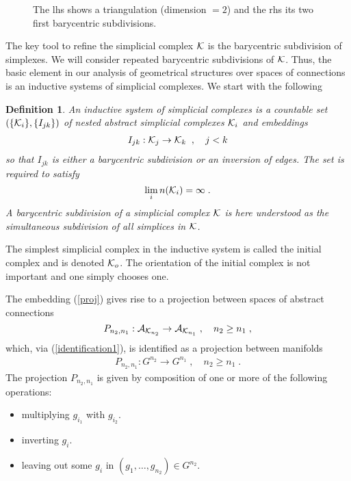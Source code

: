 \documentclass[12pt]{article}
\newcommand{\ba}{\begin{eqnarray}}
\newcommand{\ea}{\end{eqnarray}}
\def\ca{{\cal A}}
\def\ck{{\cal K}}
\newtheorem{definition}[thm]{Definition}
\begin{document}
\begin{figure}[t]
\begin{center}
 
\caption{The lhs shows a triangulation (dimension $=2$) and the rhs its two first barycentric subdivisions.}
\end{center}
\end{figure}
The key tool to refine the simplicial complex $\ck$ is the barycentric subdivision of simplexes. We will consider repeated barycentric subdivisions of $\ck$. Thus, the basic element in our analysis of geometrical structures over spaces of connections is an inductive systems of simplicial complexes. We start with the following
\begin{definition}
An inductive system of simplicial complexes is a countable set $(\{\ck_i\},\{I_{jk}\})$ of nested abstract simplicial complexes $\ck_i$ and embeddings
\ba
I_{jk}:\ck_j\rightarrow \ck_k\;\;,\quad j<k
\label{proj}
\ea
so that $I_{jk}$ is either a barycentric subdivision or an inversion of edges. The set is required to satisfy
\[
\lim_i n(\ck_i)=\infty\;.
\]
A barycentric subdivision of a simplicial complex $\ck$ is here understood as the simultaneous subdivision of all simplices in $\ck$.
\end{definition}
The simplest simplicial complex in the inductive system is called the initial complex and is denoted $\ck_o$. The orientation of the initial complex is not important and one simply chooses one.

The embedding (\ref{proj}) gives rise to a projection between spaces of abstract connections
\[
P_{n_2,n_1}:\ca_{\ck_{n_2}}\rightarrow \ca_{\ck_{n_1}}\;,\quad n_2\geq n_1\;,
\]
which, via (\ref{identification1}), is identified as a projection between manifolds
\ba 
P_{n_2,n_1}:  G^{n_2}\rightarrow G^{n_1}\;,\quad n_2\geq n_1\;.
\label{prO}
\ea
The projection $P_{n_2,n_1}$ is given by composition of one or more of the following operations: 
\begin{itemize}
\item 
multiplying $g_{i_1}$ with $g_{i_2}$.
\item 
inverting $g_i$.
\item 
leaving out some $g_i$ in $(g_1,\ldots,g_{n_2})\in G^{n_2}$.
\end{itemize}
\end{document}

